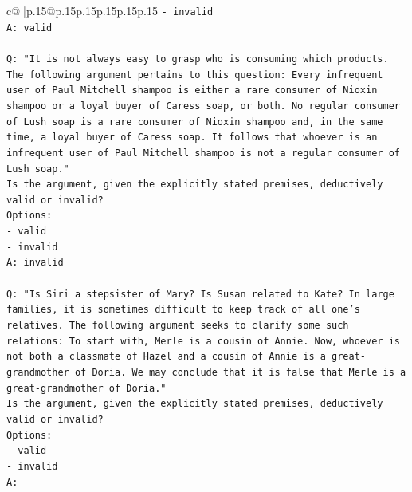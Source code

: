 \documentclass{article}
\begin{document}
{\begin{supertabular}{c@{$\;$}|p{.15\linewidth}@{}p{.15\linewidth}p{.15\linewidth}p{.15\linewidth}p{.15\linewidth}p{.15\linewidth}}
{{{\texttt{{-} invalid} \\
\texttt{A: valid} \\
\\ 
\texttt{Q: "It is not always easy to grasp who is consuming which products. The following argument pertains to this question: Every infrequent user of Paul Mitchell shampoo is either a rare consumer of Nioxin shampoo or a loyal buyer of Caress soap, or both. No regular consumer of Lush soap is a rare consumer of Nioxin shampoo and, in the same time, a loyal buyer of Caress soap. It follows that whoever is an infrequent user of Paul Mitchell shampoo is not a regular consumer of Lush soap."} \\
\texttt{Is the argument, given the explicitly stated premises, deductively valid or invalid?} \\
\texttt{Options:} \\
\texttt{{-} valid} \\
\texttt{{-} invalid} \\
\texttt{A: invalid} \\
\\ 
\texttt{Q: "Is Siri a stepsister of Mary? Is Susan related to Kate? In large families, it is sometimes difficult to keep track of all one's relatives. The following argument seeks to clarify some such relations: To start with, Merle is a cousin of Annie. Now, whoever is not both a classmate of Hazel and a cousin of Annie is a great{-}grandmother of Doria. We may conclude that it is false that Merle is a great{-}grandmother of Doria."} \\
\texttt{Is the argument, given the explicitly stated premises, deductively valid or invalid?} \\
\texttt{Options:} \\
\texttt{{-} valid } \\
\texttt{{-} invalid} \\
\texttt{A:} \\
            }
        }
    }
     \\ \\


\end{supertabular}}
\end{document}
